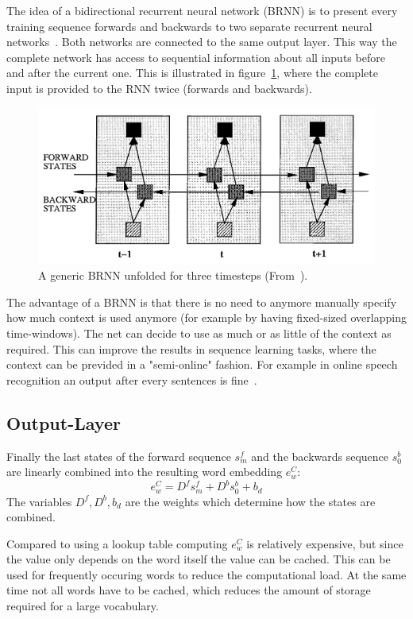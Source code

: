 The idea of a bidirectional recurrent neural network (BRNN) is to present every training sequence forwards and backwards to two separate
recurrent neural networks~\cite{IEEE:journals/singals/Schuster1997}.
Both networks are connected to the same output layer. This way the complete network has access to sequential information 
about all inputs before and after the current one.
This is illustrated in figure~\ref{fig:brnn-unfolded}, where the complete input is provided to the RNN twice (forwards and backwards).
\begin{figure}[H]
\begin{center}
  \includegraphics[width=\textwidth]{./img/brnn-unfolded}
  \caption{A generic BRNN unfolded for three timesteps (From~\cite{IEEE:journals/singals/Schuster1997}).}
  \label{fig:brnn-unfolded}
\end{center}
\end{figure}

The advantage of a BRNN is that there is no need to anymore manually specify how much context is 
used anymore (for example by having fixed-sized overlapping time-windows).
The net can decide to use as much or as little of the context as required. 
This can improve the results in sequence learning tasks, where the context can be previded in a "semi-online" fashion.
For example in online speech recognition an output after every sentences is fine~\cite{DBLP:journals/nn/GravesS05}. 



\subsection{Output-Layer}

Finally the last states of the forward sequence $s_{m}^f$ and the backwards sequence $s_{0}^b$
are linearly combined into the resulting word embedding $e_{w}^C$:
\[
  e_{w}^C = D^f s_{m}^f + D^b s_{0}^b + b_d
\]
The variables $D^f, D^b, b_d$ are the weights which determine how the states are combined.

Compared to using a lookup table computing $e_{w}^C$ is relatively expensive, but since the value only depends on
the word itself the value can be cached. This can be used for frequently occuring words to reduce the computational load.
At the same time not all words have to be cached, which reduces the amount of storage required for a large vocabulary.